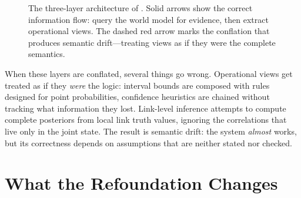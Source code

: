 \documentclass[11pt,openany]{report}
\begin{document}
\begin{figure}[htbp]
\centering
{}
\caption{The three-layer architecture of \xiPLN{}.  Solid arrows show the
correct information flow: query the world model for evidence, then extract
operational views.  The dashed red arrow marks the conflation that produces
semantic drift---treating views as if they were the complete semantics.}
\label{fig:three-layer-architecture}
\end{figure}

When these layers are conflated, several things go wrong.  Operational views
get treated as if they \emph{were} the logic: interval bounds are composed
with rules designed for point probabilities, confidence heuristics are chained
without tracking what information they lost.  Link-level inference attempts to
compute complete posteriors from local link truth values, ignoring the
correlations that live only in the joint state.  The result is semantic drift:
the system \emph{almost} works, but its correctness depends on assumptions
that are neither stated nor checked.

\section{What the Refoundation Changes}
\end{document}
